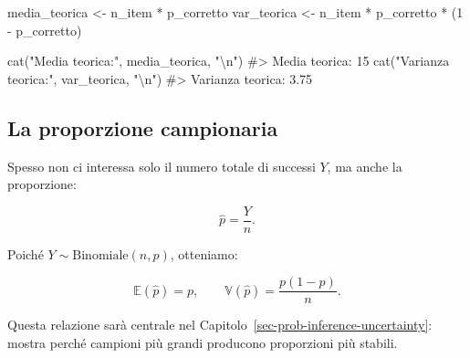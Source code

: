 \documentclass[
  italian,
  letterpaper,
  a4paper,
  11pt,
  open=any]{scrbook}
\newenvironment{Shaded}{\begin{snugshade}}{\end{snugshade}}
\newcommand{\CommentTok}[1]{\textcolor[rgb]{0.37,0.37,0.37}{#1}}
\newcommand{\DecValTok}[1]{\textcolor[rgb]{0.68,0.00,0.00}{#1}}
\newcommand{\FunctionTok}[1]{\textcolor[rgb]{0.28,0.35,0.67}{#1}}
\newcommand{\NormalTok}[1]{\textcolor[rgb]{0.00,0.23,0.31}{#1}}
\newcommand{\OtherTok}[1]{\textcolor[rgb]{0.00,0.23,0.31}{#1}}
\newcommand{\SpecialCharTok}[1]{\textcolor[rgb]{0.37,0.37,0.37}{#1}}
\newcommand{\StringTok}[1]{\textcolor[rgb]{0.13,0.47,0.30}{#1}}
\theoremstyle{plain}
\theoremstyle{definition}
\theoremstyle{definition}
\theoremstyle{remark}
\begin{document}
\begin{Shaded}
\begin{Highlighting}[]
\NormalTok{media\_teorica }\OtherTok{\textless{}{-}}\NormalTok{ n\_item }\SpecialCharTok{*}\NormalTok{ p\_corretto}
\NormalTok{var\_teorica }\OtherTok{\textless{}{-}}\NormalTok{ n\_item }\SpecialCharTok{*}\NormalTok{ p\_corretto }\SpecialCharTok{*}\NormalTok{ (}\DecValTok{1} \SpecialCharTok{{-}}\NormalTok{ p\_corretto)}

\FunctionTok{cat}\NormalTok{(}\StringTok{"Media teorica:"}\NormalTok{, media\_teorica, }\StringTok{"}\SpecialCharTok{\textbackslash{}n}\StringTok{"}\NormalTok{)}
\CommentTok{\#\textgreater{} Media teorica: 15}
\FunctionTok{cat}\NormalTok{(}\StringTok{"Varianza teorica:"}\NormalTok{, var\_teorica, }\StringTok{"}\SpecialCharTok{\textbackslash{}n}\StringTok{"}\NormalTok{)}
\CommentTok{\#\textgreater{} Varianza teorica: 3.75}
\end{Highlighting}
\end{Shaded}

\subsection{La proporzione
campionaria}\label{la-proporzione-campionaria}

Spesso non ci interessa solo il numero totale di successi \(Y\), ma
anche la proporzione:

\[
\hat p = \frac{Y}{n}.
\]

Poiché \(Y \sim \mathrm{Binomiale}(n,p)\), otteniamo:

\[
\mathbb{E}(\hat p)=p,
\qquad
\mathbb{V}(\hat p)=\frac{p(1-p)}{n}.
\]

Questa relazione sarà centrale nel
Capitolo~\ref{sec-prob-inference-uncertainty}: mostra perché campioni
più grandi producono proporzioni più stabili.
\end{document}
